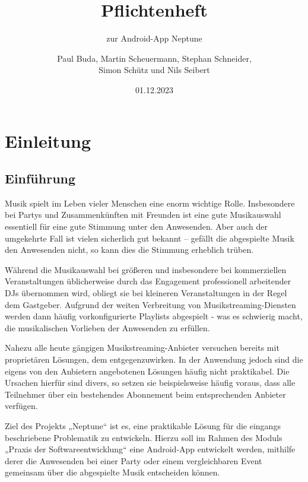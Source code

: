 \documentclass[oneside, ngerman]{sdqtechreport}
\author{Paul Buda, Martin Scheuermann, Stephan Schneider, \\
Simon Schütz und Nils Seibert}
\title{Pflichtenheft}
\subtitle{zur Android-App Neptune}
\date{01.12.2023}
\begin{document}
\setpdf

\maketitle

\tableofcontents

\cleardoublepage


\chapter{Einleitung}
\label{chap:Einleitung}

\section{Einführung}
\label{sec:Einleitung:Einführung}
Musik spielt im Leben vieler Menschen eine enorm wichtige Rolle. Insbesondere bei Partys und Zusammenkünften mit Freunden ist eine gute Musikauswahl essentiell für eine gute Stimmung unter den Anwesenden. Aber auch der umgekehrte Fall ist vielen sicherlich gut bekannt – gefällt die abgespielte Musik den Anwesenden nicht, so kann dies die Stimmung erheblich trüben.

Während die Musikauswahl bei größeren und insbesondere bei kommerziellen Veranstaltungen üblicherweise durch das Engagement professionell arbeitender DJs übernommen wird, obliegt sie bei kleineren Veranstaltungen in der Regel dem Gastgeber. Aufgrund der weiten Verbreitung von Musikstreaming-Diensten werden dann häufig vorkonfigurierte Playlists abgespielt - was es schwierig macht, die musikalischen Vorlieben der Anwesenden zu erfüllen.

Nahezu alle heute gängigen Musikstreaming-Anbieter versuchen bereits mit proprietären Lösungen, dem entgegenzuwirken. In der Anwendung jedoch sind die eigens von den Anbietern angebotenen Lösungen häufig nicht praktikabel. Die Ursachen hierfür sind divers, so setzen sie beispielsweise häufig voraus, dass alle Teilnehmer über ein bestehendes Abonnement beim entsprechenden Anbieter verfügen.

Ziel des Projekts „Neptune“ ist es, eine praktikable Lösung für die eingangs beschriebene Problematik zu entwickeln. Hierzu soll im Rahmen des Moduls „Praxis der Softwareentwicklung“ eine Android-App entwickelt werden, mithilfe derer die Anwesenden bei einer Party oder einem vergleichbaren Event gemeinsam über die abgespielte Musik entscheiden können. 
\end{document}
